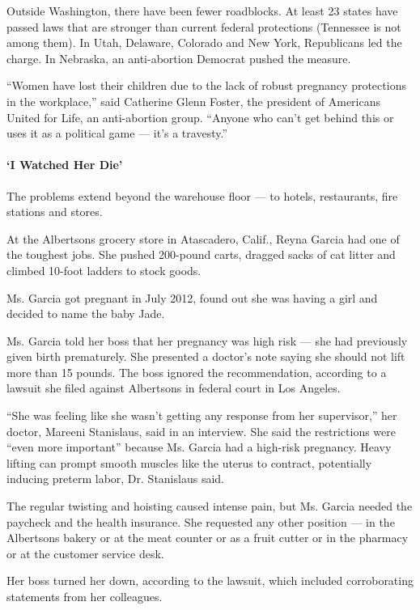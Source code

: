 Outside Washington, there have been fewer roadblocks. At least 23 states
have passed laws that are stronger than current federal protections
(Tennessee is not among them). In Utah, Delaware, Colorado and New York,
Republicans led the charge. In Nebraska, an anti-abortion Democrat
pushed the measure.

``Women have lost their children due to the lack of robust pregnancy
protections in the workplace,'' said Catherine Glenn Foster, the
president of Americans United for Life, an anti-abortion group. ``Anyone
who can't get behind this or uses it as a political game --- it's a
travesty.''

\hypertarget{i-watched-her-die}{%
\paragraph{`I Watched Her Die'}\label{i-watched-her-die}}

The problems extend beyond the warehouse floor --- to hotels,
restaurants, fire stations and stores.

At the Albertsons grocery store in Atascadero, Calif., Reyna Garcia had
one of the toughest jobs. She pushed 200-pound carts, dragged sacks of
cat litter and climbed 10-foot ladders to stock goods.

Ms. Garcia got pregnant in July 2012, found out she was having a girl
and decided to name the baby Jade.

Ms. Garcia told her boss that her pregnancy was high risk --- she had
previously given birth prematurely. She presented a doctor's note saying
she should not lift more than 15 pounds. The boss ignored the
recommendation, according to a lawsuit she filed against Albertsons in
federal court in Los Angeles.

``She was feeling like she wasn't getting any response from her
supervisor,'' her doctor, Mareeni Stanislaus, said in an interview. She
said the restrictions were ``even more important'' because Ms. Garcia
had a high-risk pregnancy. Heavy lifting can prompt smooth muscles like
the uterus to contract, potentially inducing preterm labor, Dr.
Stanislaus said.

The regular twisting and hoisting caused intense pain, but Ms. Garcia
needed the paycheck and the health insurance. She requested any other
position --- in the Albertsons bakery or at the meat counter or as a
fruit cutter or in the pharmacy or at the customer service desk.

Her boss turned her down, according to the lawsuit, which included
corroborating statements from her colleagues.

